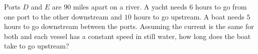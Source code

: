 Ports $D$ and $E$ are $90$ miles apart on a river. A yacht needs $6$ hours to go from one port to the other downstream and $10$ hours to go upstream. A boat needs $5$ hours to go downstream between the ports. Assuming the current is the same for both and each vessel has a constant speed in still water, how long does the boat take to go upstream?
